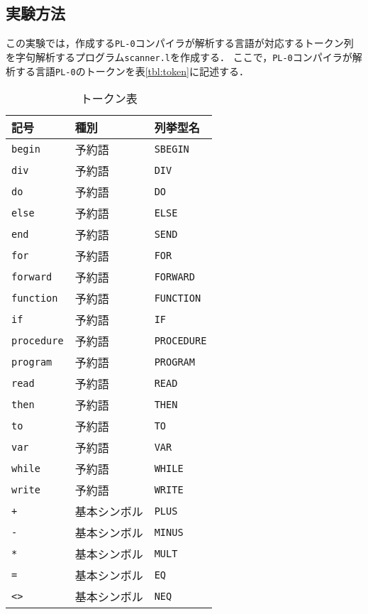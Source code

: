 \documentclass[uplatex]{jsarticle}
\begin{document}
\subsection{実験方法}
この実験では，作成する\verb#PL-0#コンパイラが解析する言語が対応するトークン列を字句解析するプログラム\verb#scanner.l#を作成する．
ここで，\verb#PL-0#コンパイラが解析する言語\verb#PL-0#のトークンを表\ref{tbl:token}に記述する．
\begin{table}[tb]
  \begin{center}
    \caption{トークン表}
    \begin{tabular}{|l|l|l|} \hline
      記号 & 種別 & 列挙型名 \\ \hline \hline
      \verb#begin# & 予約語 & \verb#SBEGIN# \\
      \verb#div# & 予約語 & \verb#DIV# \\
      \verb#do# & 予約語 & \verb#DO# \\
      \verb#else# & 予約語 & \verb#ELSE# \\
      \verb#end# & 予約語 & \verb#SEND# \\
      \verb#for# & 予約語 & \verb#FOR# \\
      \verb#forward# & 予約語 & \verb#FORWARD# \\
      \verb#function# & 予約語 & \verb#FUNCTION# \\
      \verb#if# & 予約語 & \verb#IF# \\
      \verb#procedure# & 予約語 & \verb#PROCEDURE# \\
      \verb#program# & 予約語 & \verb#PROGRAM# \\
      \verb#read# & 予約語 & \verb#READ# \\
      \verb#then# & 予約語 & \verb#THEN# \\
      \verb#to# & 予約語 & \verb#TO# \\
      \verb#var# & 予約語 & \verb#VAR# \\
      \verb#while# & 予約語 & \verb#WHILE# \\
      \verb#write# & 予約語 & \verb#WRITE# \\
      \hline
      \verb#+# & 基本シンボル & \verb#PLUS# \\
      \verb#-# & 基本シンボル & \verb#MINUS# \\
      \verb#*# & 基本シンボル & \verb#MULT# \\
      \verb#=# & 基本シンボル & \verb#EQ# \\
      \verb#<># & 基本シンボル & \verb#NEQ# \\

\end{tabular}
\end{center}
\end{table}
\end{document}
